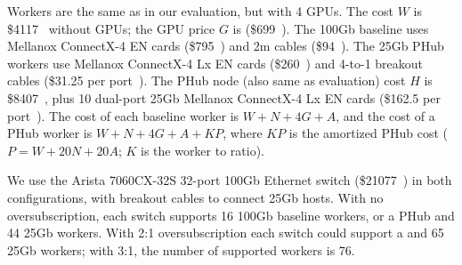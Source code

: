 Workers are the same as in our evaluation, but with 4 GPUs. The cost $W$ is \$4117~\cite{worker-price} without GPUs; the GPU price $G$ is (\$699~\cite{nvidia-1080ti}). The 100Gb baseline uses Mellanox ConnectX-4 EN cards (\$795~\cite{mellanox-eth}) and 2m cables (\$94~\cite{mellanox-cable}). The 25Gb PHub workers use Mellanox ConnectX-4 Lx EN cards (\$260~\cite{mellanox-eth}) and 4-to-1 breakout cables (\$31.25 per port~\cite{mellanox-cable}).
The PHub node (also same as evaluation) cost $H$ is \$8407~\cite{phub-price}, plus 10 dual-port 25Gb Mellanox ConnectX-4 Lx EN cards (\$162.5 per port~\cite{mellanox-eth}). The cost of each baseline worker is $W+N+4G+A$, and the cost of a PHub worker is $W+N+4G+A+KP$, where $KP$ is the amortized PHub cost ($P=W+20N+20A$; $K$ is the worker to \phub ratio).

We use the Arista 7060CX-32S 32-port 100Gb Ethernet switch (\$21077~\cite{arista-price}) in both configurations, with breakout cables to connect 25Gb hosts.
With no oversubscription, each switch supports 16 100Gb baseline workers, or a PHub and 44 25Gb workers. With 2:1 oversubscription each switch could support a \phub and 65 25Gb workers; with 3:1, the number of supported workers is 76. 





